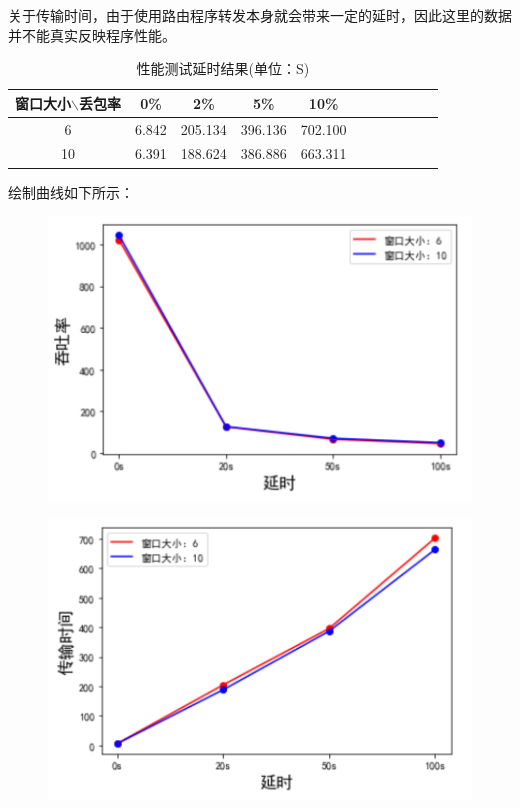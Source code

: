 \documentclass[UTF8,a4paper,10pt]{ctexart}
\begin{document}
关于传输时间，由于使用路由程序转发本身就会带来一定的延时，因此这里的数据并不能真实反映程序性能。
\begin{table}[!htbp]
  \centering
  \begin{tabular}{ccccccccccc}
  \toprule  
  窗口大小$\backslash$丢包率& 0\%& 2\%& 5\%& 10\%\\
  \midrule
  6& 6.842& 205.134& 396.136& 702.100\\
  10& 6.391& 188.624& 386.886& 663.311\\
  \bottomrule
  \end{tabular}
  \caption{性能测试延时结果(单位：S)}
\end{table}

绘制曲线如下所示：
\begin{figure}[H]
    \centering
    \includegraphics[scale=0.6]{计网7.png}
    \label{fig:7}
\end{figure}
\begin{figure}[H]
    \centering
    \includegraphics[scale=0.6]{计网8.png}
    \label{fig:8}
\end{figure}
\end{document}
